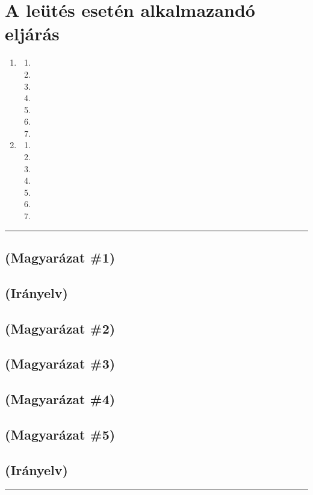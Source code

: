 \documentclass[]{report}
\newenvironment{expl}[0]%
  {\rule{\textwidth}{.2pt}\footnotesize}%
  {\rule{\textwidth}{.2pt}\normalsize}
\begin{document}
\chapter{A leütés esetén alkalmazandó eljárás}

\begin{enumerate}
\item

    \begin{enumerate}
    \item
    
    \item
    
    \item
    
    \item
    
    \item
    
    \item
    
    \item
    
    \end{enumerate}
\item

    \begin{enumerate}
    \item
    
    \item
    
    \item
    
    \item
    
    \item
    
    \item
    
    \item
    
    \end{enumerate}
\end{enumerate}

\begin{expl}
\section*{(Magyarázat \#1)}

\section*{(Irányelv)}

\section*{(Magyarázat \#2)}

\section*{(Magyarázat \#3)}

\section*{(Magyarázat \#4)}

\section*{(Magyarázat \#5)}

\section*{(Irányelv)}

\end{expl}
\end{document}
